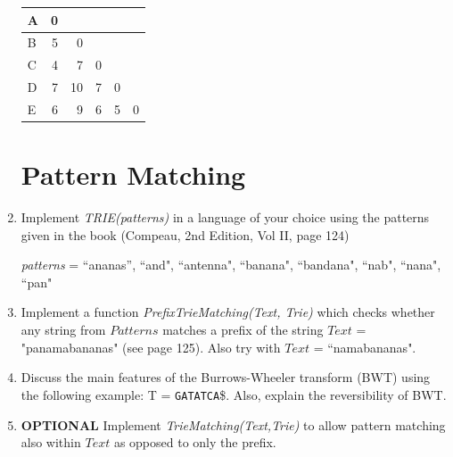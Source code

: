 \documentclass[11pt,runningheads,a4paper]{article}
\newcommand{\DNA}[1]{\texttt{\uppercase{#1}}}
\begin{document}
\begin{enumerate}
\begin{table}[H]
\begin{tabular}{|l|r|r|r|l|l|}
        A & 0 & \multicolumn{1}{l|}{} & \multicolumn{1}{l|}{} &  &  \\ \hline
        B & 5 & 0 & \multicolumn{1}{l|}{} &  &  \\ \hline
        C & 4 & 7 & 0 &  &  \\ \hline
        D & 7 & 10 & 7 & \multicolumn{1}{r|}{0} &  \\ \hline
        E & 6 & 9 & 6 & \multicolumn{1}{r|}{5} & \multicolumn{1}{r|}{0} \\ \hline
      \end{tabular}
      \label{}
    \end{table}

\section*{Pattern Matching}\label{sec:burrows_wheeler_transformation}
\item  Implement \textit{TRIE(patterns)} in a language of your choice using the patterns given in the book (Compeau, 2nd Edition, Vol II, page 124) 

\textit{patterns} =  ``ananas'', ``and", ``antenna", ``banana", ``bandana", ``nab", ``nana", ``pan"

\item Implement a function \textit{PrefixTrieMatching(Text, Trie)} which checks whether any string from $Patterns$ matches a prefix of the string $Text$ = "panamabananas" (see page 125). Also try with $Text$ = ``namabananas".

  \item Discuss the main features of the Burrows-Wheeler transform (BWT) using the following example: T = \DNA{GATATCA}\$. Also, explain the reversibility of BWT.

\item  \textbf{OPTIONAL}  Implement \textit{TrieMatching(Text,Trie)} to allow pattern matching also within $Text$ as opposed to only the prefix.

\end{enumerate}
    
\end{document}
